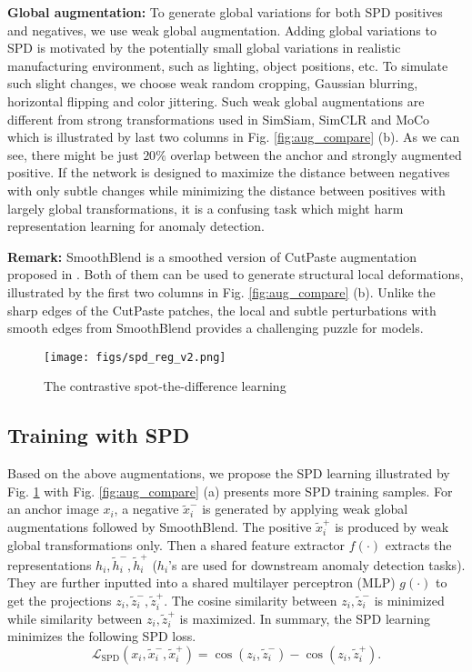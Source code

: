 \noindent\textbf{Global augmentation:} To generate global variations for both SPD positives and negatives, we use weak global augmentation. Adding global variations to SPD is motivated by the potentially small global variations in realistic manufacturing environment, such as lighting, object positions, etc. To simulate such slight changes, we choose weak random cropping, Gaussian blurring, horizontal flipping and color jittering. Such weak global augmentations are different from strong transformations used in SimSiam, SimCLR and MoCo which is illustrated by last two columns in Fig. \ref{fig:aug_compare} (b). As we can see, there might be just $20\%$ overlap between the anchor and strongly augmented positive. If the network is designed to maximize the distance between negatives with only subtle changes while minimizing the distance between positives with largely global transformations, it is a confusing task which might harm representation learning for anomaly detection.

\noindent\textbf{Remark:} SmoothBlend is a smoothed version of CutPaste augmentation proposed in \cite{li2021cutpaste}. Both of them can be used to generate structural local deformations, illustrated by the first two columns in Fig. \ref{fig:aug_compare} (b). Unlike the sharp edges of the CutPaste patches, the local and subtle perturbations with smooth edges from SmoothBlend provides a challenging puzzle for models. 
\begin{figure}[!t]
 \centering
\texttt{[image: figs/spd\_reg\_v2.png]}
\caption{The contrastive spot-the-difference learning}
\label{fig:spd_reg}
\end{figure}
\subsection{Training with SPD}
Based on the above augmentations, we propose the SPD learning illustrated by Fig. \ref{fig:spd_reg} with Fig. \ref{fig:aug_compare} (a) presents more SPD training samples. For an anchor image $x_i$, a negative $\tilde{x}_i^-$ is generated by applying weak global augmentations followed by SmoothBlend. The positive $\tilde{x}_i^+$  is produced by weak global transformations only. Then a shared feature extractor $f(\cdot)$ extracts the representations $h_i, \tilde{h}_i^-, \tilde{h}_i^+$ ($h_i$'s are used for downstream anomaly detection tasks). They are further inputted into a shared multilayer perceptron (MLP) $g(\cdot)$ to get the projections $z_i, \tilde{z}_i^-,\tilde{z}_i^+$. The cosine similarity between $z_i, \tilde{z}_i^-$ is minimized while similarity between $z_i, \tilde{z}_i^+$ is maximized. In summary, the SPD learning minimizes the following SPD loss. 
\begin{equation}
    \mathcal{L}_{\mathrm{SPD}}(x_i,\tilde{x}_i^-,\tilde{x}_i^+)=
\cos(z_i, \tilde{z}_i^-)-\cos(z_i, \tilde{z}_i^+).
    \label{eqn:l_spd}
\end{equation}

